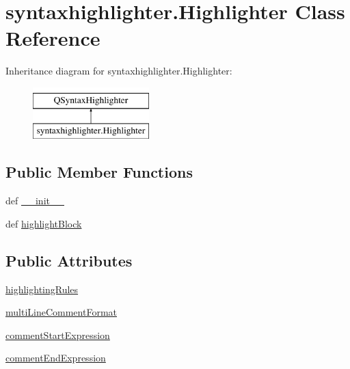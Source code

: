 \hypertarget{classsyntaxhighlighter_1_1Highlighter}{}\section{syntaxhighlighter.\+Highlighter Class Reference}
\label{classsyntaxhighlighter_1_1Highlighter}
Inheritance diagram for syntaxhighlighter.\+Highlighter\+:\begin{figure}[H]
\begin{center}
\leavevmode
\includegraphics[height=2.000000cm]{classsyntaxhighlighter_1_1Highlighter}
\end{center}
\end{figure}
\subsection*{Public Member Functions}
\begin{DoxyCompactItemize}
\item 
def \hyperlink{classsyntaxhighlighter_1_1Highlighter_abdc81af107abc7362a4348ab64d3520c}{\+\_\+\+\_\+init\+\_\+\+\_\+}
\item 
def \hyperlink{classsyntaxhighlighter_1_1Highlighter_a64c118824d0bc06ff14b2dc696158b18}{highlight\+Block}
\end{DoxyCompactItemize}
\subsection*{Public Attributes}
\begin{DoxyCompactItemize}
\item 
\hyperlink{classsyntaxhighlighter_1_1Highlighter_a60bc72567b323f3dbd2a96be2d008d41}{highlighting\+Rules}
\item 
\hyperlink{classsyntaxhighlighter_1_1Highlighter_a9c33de640ed6ae3f1a45c19939fc1899}{multi\+Line\+Comment\+Format}
\item 
\hyperlink{classsyntaxhighlighter_1_1Highlighter_a18ba1fcad7ac9db61be02a0b7cc17fad}{comment\+Start\+Expression}
\item 
\hyperlink{classsyntaxhighlighter_1_1Highlighter_aacd6039c29f73caf04f645f3358980d5}{comment\+End\+Expression}
\end{DoxyCompactItemize}


